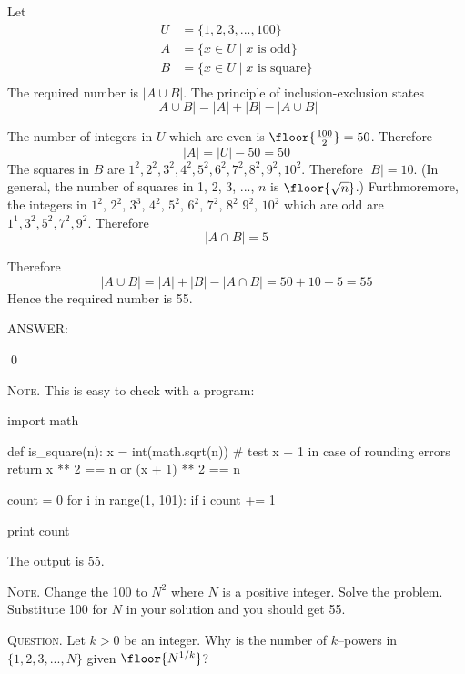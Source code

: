 Let 
\begin{align*}
U &= \{1, 2, 3, ..., 100\} \\
A &= \{x \in U \mid x \text{ is odd}\} \\
B &= \{x \in U \mid x \text{ is square}\} \\
\end{align*}
The required number is $|A \cup B|$.
The principle of inclusion-exclusion states
\[
|A \cup B| = |A| + |B| - |A \cup B|
\]

The number of integers in $U$ which are even is 
$\floor{\frac{100}{2}} = 50$.
Therefore 
\[
|A| = |U| - 50 = 50
\]
The squares in $B$ are $1^2, 2^2, 3^2, 4^2, 5^2, 6^2, 7^2, 8^2, 9^2, 10^2$.
Therefore $|B| = 10$.
(In general, the number of squares in 1, 2, 3, ..., $n$ is
$\floor{\sqrt{n}}$.)
Furthmoremore, the integers in 
$1^2$, $2^2$, $3^3$, $4^2$, $5^2$, $6^2$, $7^2$, $8^2$
$9^2$, $10^2$ which are odd are $1^1, 3^2, 5^2, 7^2, 9^2$.
Therefore 
\[
|A \cap B| = 5
\]

Therefore
\[
|A \cup B|
= |A| + |B| - |A \cap B| = 50 + 10 - 5 = 55
\]
Hence the required number is 55.

ANSWER:

\qed



\textsc{Note.} This is easy to check with a program:
\begin{console}
import math

def is_square(n):
    x = int(math.sqrt(n))
    # test x + 1 in case of rounding errors
    return x ** 2 == n or (x + 1) ** 2 == n

count = 0
for i in range(1, 101):
    if i %
        count += 1

print count
\end{console}
The output is 55.

\textsc{Note.} Change the 100 to $N^2$ where $N$ is a positive integer.
Solve the problem.
Substitute 100 for $N$ in your solution and you should get 55.

\textsc{Question.}
Let $k > 0$ be an integer.
Why is the number of $k$--powers in $\{1, 2, 3, ..., N\}$
given $\floor{N^{1/k}}$?
